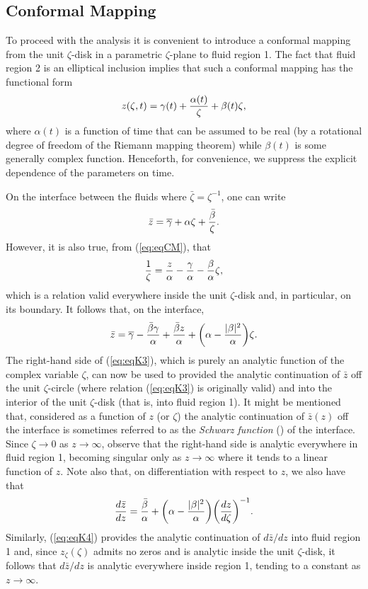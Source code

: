 \documentclass{article}
\begin{document}
\subsection{Conformal Mapping}
To proceed with the analysis it is convenient to introduce
a conformal mapping from the unit $\zeta$-disk in 
a parametric $\zeta$-plane to fluid region 1.
The fact that fluid region 2 is an elliptical inclusion 
implies that such a conformal mapping
has the functional form
\begin{equation}
z(\zeta,t) = \gamma(t) + {\alpha(t) \over \zeta} + \beta(t) \zeta,\label{eq:eqCM}
\end{equation}
where $\alpha(t)$ is a function of time that can be assumed to
be real (by a rotational degree of freedom of the Riemann mapping
theorem) while $\beta(t)$ is some generally complex function.
Henceforth, for convenience, we suppress the explicit
dependence of the parameters on time.

On the interface between the fluids where $\bar{\zeta} = \zeta^{-1}$,
one can write
\begin{equation}
\bar{z} = \overline \gamma + \alpha \zeta +{\bar{\beta} \over \zeta}.
\end{equation}
However, it is also true, from (\ref{eq:eqCM}), that
\begin{equation}
{1 \over \zeta} = {z \over \alpha} - {\gamma \over \alpha}
- {\beta \over \alpha} \zeta,
\end{equation}
which is a relation valid everywhere inside the unit $\zeta$-disk and,
in particular, on its boundary. It follows that, on the interface,
\begin{equation}
\bar{z} = \overline \gamma - {\bar{\beta} \gamma \over \alpha}
+{\bar{\beta} z \over \alpha} + {\left(\alpha - {|\beta|^2 \over \alpha} \right)} \zeta.
\label{eq:eqK3}
\end{equation}
The right-hand side of (\ref{eq:eqK3}), which is purely an analytic
function of the complex variable $\zeta$, can now be used to
provided the analytic continuation of $\bar{z}$
off the unit $\zeta$-circle (where relation (\ref{eq:eqK3}) is originally valid) and into the interior of the unit $\zeta$-disk (that is, into fluid region 1). It might be mentioned that, considered as a function of $z$ (or $\zeta$) the analytic continuation of $\bar z(z)$ off the interface is sometimes
referred to as the {\em Schwarz function} (\citealt{Davis}) of the interface.
Since $\zeta \to 0$ as $z \to \infty$,  observe that  the right-hand side
is analytic everywhere in fluid region 1, becoming singular only as $z \to
\infty$ where it tends to a linear function of $z$. Note also that, on differentiation
with respect to $z$, we also have that
\begin{equation}
{d \bar z \over dz} = {\bar \beta \over \alpha}
+ {\left(\alpha - {|\beta|^2 \over \alpha} \right)} 
{\left({dz \over d \zeta} \right )}^{-1}.\label{eq:eqK4}
\end{equation}
Similarly, (\ref{eq:eqK4}) provides the analytic continuation of $d \bar{z}/dz$ into fluid region 1 and, since $z_\zeta(\zeta)$ admits no zeros and is analytic
inside the unit $\zeta$-disk, it follows that $d \bar z/dz$ is analytic everywhere inside region 1, tending to a constant as $z \to \infty$.
\end{document}
